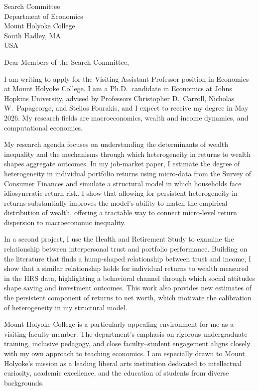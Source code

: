 \documentclass[11pt,letterpaper]{letter}
\begin{document}
\begin{letter}{Search Committee \\
Department of Economics \\
Mount Holyoke College \\
South Hadley, MA \\ USA}

\opening{Dear Members of the Search Committee,}

I am writing to apply for the Visiting Assistant Professor position in Economics at Mount Holyoke College. I am a Ph.D.\ candidate in Economics at Johns Hopkins University, advised by Professors Christopher D.~Carroll, Nicholas W.~Papageorge, and Stelios Fourakis, and I expect to receive my degree in May 2026. My research fields are macroeconomics, wealth and income dynamics, and computational economics.

My research agenda focuses on understanding the determinants of wealth inequality and the mechanisms through which heterogeneity in returns to wealth shapes aggregate outcomes. In my job-market paper, I estimate the degree of heterogeneity in individual portfolio returns using micro-data from the Survey of Consumer Finances and simulate a structural model in which households face idiosyncratic return risk. I show that allowing for persistent heterogeneity in returns substantially improves the model’s ability to match the empirical distribution of wealth, offering a tractable way to connect micro-level return dispersion to macroeconomic inequality.

In a second project, I use the Health and Retirement Study to examine the relationship between interpersonal trust and portfolio performance. Building on the literature that finds a hump-shaped relationship between trust and income, I show that a similar relationship holds for individual returns to wealth measured in the HRS data, highlighting a behavioral channel through which social attitudes shape saving and investment outcomes. This work also provides new estimates of the persistent component of returns to net worth, which motivate the calibration of heterogeneity in my structural model.

Mount Holyoke College is a particularly appealing environment for me as a visiting faculty member. The department’s emphasis on rigorous undergraduate training, inclusive pedagogy, and close faculty–student engagement aligns closely with my own approach to teaching economics. I am especially drawn to Mount Holyoke’s mission as a leading liberal arts institution dedicated to intellectual curiosity, academic excellence, and the education of students from diverse backgrounds.


\end{letter}
\end{document}
